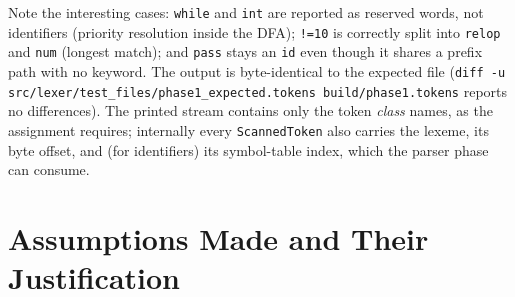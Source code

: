\documentclass[11pt,a4paper]{article}
\begin{document}
Note the interesting cases: \texttt{while} and \texttt{int} are reported as
reserved words, not identifiers (priority resolution inside the DFA);
\texttt{!=10} is correctly split into \texttt{relop} and \texttt{num}
(longest match); and \texttt{pass} stays an \texttt{id} even though it shares a
prefix path with no keyword. The output is byte-identical to the expected file
(\texttt{diff -u src/lexer/test\_files/phase1\_expected.tokens build/phase1.tokens}
reports no differences). The printed stream contains only the token
\emph{class} names, as the assignment requires; internally every
\texttt{ScannedToken} also carries the lexeme, its byte offset, and (for
identifiers) its symbol-table index, which the parser phase can consume.

\section{Assumptions Made and Their Justification}
\end{document}
